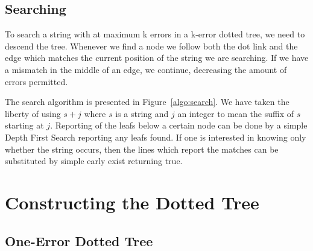 \documentclass[a4paper,10pt]{article}
\begin{document}
\subsection{Searching}

To search a string with at maximum k errors in a k-error dotted tree, we need to descend the tree. Whenever we find a node we follow both the dot link and the edge which matches the current position of the string we are searching. If we have a mismatch in the middle of an edge, we continue, decreasing the amount of errors permitted.



The search algorithm is presented in Figure~\ref{algo:search}. We have taken the liberty of using $s+j$ where $s$ is a string and $j$ an integer to mean the suffix of $s$ starting at $j$. Reporting of the leafs below a certain node can be done by a simple Depth First Search reporting any leafs found. If one is interested in knowing only whether the string occurs, then the lines which report the matches can be substituted by simple early exist returning true.


\section{Constructing the Dotted Tree}

\subsection{One-Error Dotted Tree}





\end{document}
